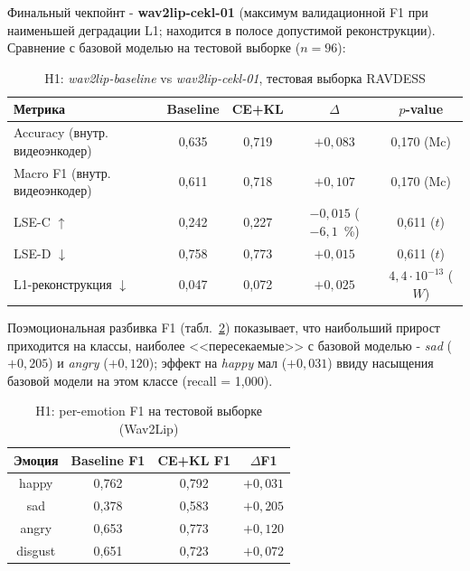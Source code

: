 \documentclass[a4paper, 12pt, oneside, openany]{article}
\begin{document}
Финальный чекпойнт - \textbf{wav2lip-cekl-01} (максимум валидационной F1 при наименьшей деградации L1; находится в полосе допустимой реконструкции). Сравнение с базовой моделью на тестовой выборке ($n=96$):

\begin{table}[H]
\caption{H1: \textit{wav2lip-baseline} vs \textit{wav2lip-cekl-01}, тестовая выборка RAVDESS}
\label{tab:h1_test}
\centering
\small
\begin{tabular}{|p{4cm}|c|c|c|c|}
\hline
\textbf{Метрика} & \textbf{Baseline} & \textbf{CE+KL} & $\Delta$ & $p$-value \\
\hline
Accuracy (внутр. видеоэнкодер) & 0,635 & 0,719 & $+0,083$ & 0,170 (Mc) \\
\hline
Macro F1 (внутр. видеоэнкодер) & 0,611 & 0,718 & $+0,107$ & 0,170 (Mc) \\
\hline
LSE-C $\uparrow$ & 0,242 & 0,227 & $-0,015$ ($-6{,}1$~\%) & 0,611 ($t$) \\
\hline
LSE-D $\downarrow$ & 0,758 & 0,773 & $+0,015$ & 0,611 ($t$) \\
\hline
L1-реконструкция $\downarrow$ & 0,047 & 0,072 & $+0,025$ & $4{,}4\!\cdot\!10^{-13}$ ($W$) \\
\hline
\end{tabular}
\end{table}

Поэмоциональная разбивка F1 (табл.~\ref{tab:h1_per_emo}) показывает, что наибольший прирост приходится на классы, наиболее <<пересекаемые>> с базовой моделью - \textit{sad} ($+0{,}205$) и \textit{angry} ($+0{,}120$); эффект на \textit{happy} мал ($+0{,}031$) ввиду насыщения базовой модели на этом классе (recall = 1,000).

\begin{table}[H]
\caption{H1: per-emotion F1 на тестовой выборке (Wav2Lip)}
\label{tab:h1_per_emo}
\centering
\small
\begin{tabular}{|c|c|c|c|}
\hline
\textbf{Эмоция} & \textbf{Baseline F1} & \textbf{CE+KL F1} & $\Delta$F1 \\
\hline
happy & 0,762 & 0,792 & $+0,031$ \\
\hline
sad & 0,378 & 0,583 & $+0,205$ \\
\hline
angry & 0,653 & 0,773 & $+0,120$ \\
\hline
disgust & 0,651 & 0,723 & $+0,072$ \\
\hline
\end{tabular}
\end{table}
\end{document}
